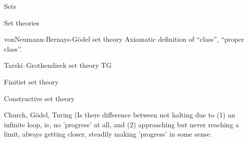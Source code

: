 \begin{plSection}{Sets}
\begin{plSection}{Set theories}
\begin{plSection}{vonNeumann-Bernays-G\"{o}del set theory}
Axiomatic definition of ``class'', ``proper class''.

\end{plSection}%
\begin{plSection}{Tarski–Grothendieck set theory}
\textsf{TG}
\end{plSection}%
\begin{plSection}{Finitist set theory}
\cite{wiki:FinitistSetTheory}
\end{plSection}%
\begin{plSection}{Constructive set theory}
\cite{wiki:ConstructiveSetTheory}
\end{plSection}%
\end{plSection}%
\begin{plSection}{Church, G\"{o}del, Turing}
(Is there difference between 
not halting due to (1) an infinite loop, ie,
no 'progress' at all,
and (2) approaching but never reaching a limit,
always getting closer, steadily making 'progress' in some sense.
\end{plSection}%
\end{plSection}%

